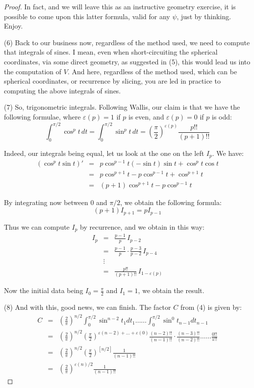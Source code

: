 \documentclass[12pt]{amsbook}
\begin{document}
\begin{proof}
In fact, and we will leave this as an instructive geometry exercise, it is possible to come upon this latter formula, valid for any $\psi$, just by thinking. Enjoy.

\medskip

(6) Back to our business now, regardless of the method used, we need to compute that integrals of sines. I mean, even when short-circuiting the spherical coordinates, via some direct geometry, as suggested in (5), this would lead us into the computation of $V$. And here, regardless of the method used, which can be spherical coordinates, or recurrence by slicing, you are led in practice to computing the above integrals of sines. 

\medskip

(7) So, trigonometric integrals. Following Wallis, our claim is that we have the following formulae, where $\varepsilon(p)=1$ if $p$ is even, and $\varepsilon(p)=0$ if $p$ is odd:
$$\int_0^{\pi/2}\cos^pt\,dt=\int_0^{\pi/2}\sin^pt\,dt=\left(\frac{\pi}{2}\right)^{\varepsilon(p)}\frac{p!!}{(p+1)!!}$$

Indeed, our integrals being equal, let us look at the one on the left $I_p$. We have:
\begin{eqnarray*}
(\cos^pt\sin t)'
&=&p\cos^{p-1}t(-\sin t)\sin t+\cos^pt\cos t\\
&=&p\cos^{p+1}t-p\cos^{p-1}t+\cos^{p+1}t\\
&=&(p+1)\cos^{p+1}t-p\cos^{p-1}t
\end{eqnarray*}

By integrating now between $0$ and $\pi/2$, we obtain the following formula:
$$(p+1)I_{p+1}=pI_{p-1}$$

Thus we can compute $I_p$ by recurrence, and we obtain in this way:
\begin{eqnarray*}
I_p
&=&\frac{p-1}{p}\,I_{p-2}\\
&=&\frac{p-1}{p}\cdot\frac{p-3}{p-2}\,I_{p-4}\\
&\vdots&\\
&=&\frac{p!!}{(p+1)!!}\,I_{1-\varepsilon(p)}
\end{eqnarray*}

Now the initial data being $I_0=\frac{\pi}{2}$ and $I_1=1$, we obtain the result.

\medskip

(8) And with this, good news, we can finish. The factor $C$ from (4) is given by:
\begin{eqnarray*}
C
&=&\left(\frac{2}{\pi}\right)^{n/2}\int_0^{\pi/2}\sin^{n-2}t_1dt_1\ldots\ldots\int_0^{\pi/2}\sin^0t_{n-1}dt_{n-1}\\
&=&\left(\frac{2}{\pi}\right)^{n/2}\left(\frac{\pi}{2}\right)^{\varepsilon(n-2)+\ldots+\varepsilon(0)}\frac{(n-2)!!}{(n-1)!!}\cdot\frac{(n-3)!!}{(n-2)!!}\ldots\ldots\frac{0!!}{1!!}\\
&=&\left(\frac{2}{\pi}\right)^{n/2}\left(\frac{\pi}{2}\right)^{[n/2]}\frac{1}{(n-1)!!}\\
&=&\left(\frac{2}{\pi}\right)^{\varepsilon(n)/2}\frac{1}{(n-1)!!}
\end{eqnarray*}


\end{proof}
\end{document}
